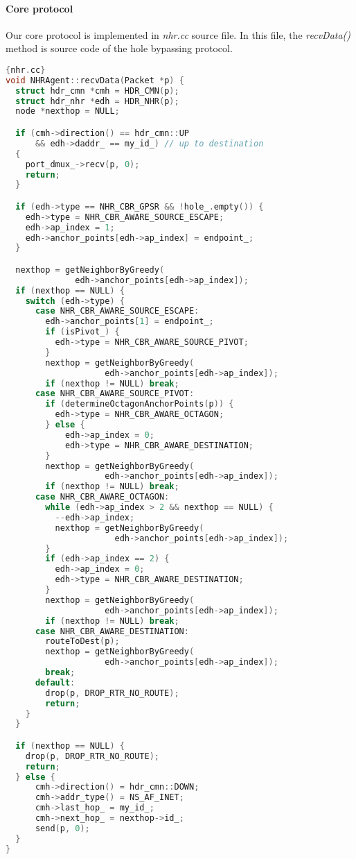 \paragraph{Core protocol \\}
Our core protocol is implemented in \emph{nhr.cc} source file. In this file, the \emph{recvData()} method is source code of the hole bypassing protocol. 
\begin{lstlisting}[language=C]{nhr.cc}
void NHRAgent::recvData(Packet *p) {
  struct hdr_cmn *cmh = HDR_CMN(p);
  struct hdr_nhr *edh = HDR_NHR(p);
  node *nexthop = NULL;

  if (cmh->direction() == hdr_cmn::UP 
      && edh->daddr_ == my_id_) // up to destination
  {
    port_dmux_->recv(p, 0);
    return;
  }

  if (edh->type == NHR_CBR_GPSR && !hole_.empty()) {
    edh->type = NHR_CBR_AWARE_SOURCE_ESCAPE;
    edh->ap_index = 1;
    edh->anchor_points[edh->ap_index] = endpoint_;
  }

  nexthop = getNeighborByGreedy(
              edh->anchor_points[edh->ap_index]);
  if (nexthop == NULL) {
    switch (edh->type) {
      case NHR_CBR_AWARE_SOURCE_ESCAPE:
        edh->anchor_points[1] = endpoint_;
        if (isPivot_) {
          edh->type = NHR_CBR_AWARE_SOURCE_PIVOT;
        }
        nexthop = getNeighborByGreedy(
                    edh->anchor_points[edh->ap_index]);
        if (nexthop != NULL) break;
      case NHR_CBR_AWARE_SOURCE_PIVOT:
        if (determineOctagonAnchorPoints(p)) {
          edh->type = NHR_CBR_AWARE_OCTAGON;
        } else {
            edh->ap_index = 0;
            edh->type = NHR_CBR_AWARE_DESTINATION;
        }
        nexthop = getNeighborByGreedy(
                    edh->anchor_points[edh->ap_index]);
        if (nexthop != NULL) break;
      case NHR_CBR_AWARE_OCTAGON:
        while (edh->ap_index > 2 && nexthop == NULL) {
          --edh->ap_index;
          nexthop = getNeighborByGreedy(
                      edh->anchor_points[edh->ap_index]);
        }
        if (edh->ap_index == 2) {
          edh->ap_index = 0;
          edh->type = NHR_CBR_AWARE_DESTINATION;
        }
        nexthop = getNeighborByGreedy(
                    edh->anchor_points[edh->ap_index]);
        if (nexthop != NULL) break;
      case NHR_CBR_AWARE_DESTINATION:
        routeToDest(p);
        nexthop = getNeighborByGreedy(
                    edh->anchor_points[edh->ap_index]);
        break;
      default:
        drop(p, DROP_RTR_NO_ROUTE);
        return;
    }
  }

  if (nexthop == NULL) {
    drop(p, DROP_RTR_NO_ROUTE);
    return;
  } else {
      cmh->direction() = hdr_cmn::DOWN;
      cmh->addr_type() = NS_AF_INET;
      cmh->last_hop_ = my_id_;
      cmh->next_hop_ = nexthop->id_;
      send(p, 0);
  }
}
\end{lstlisting}

